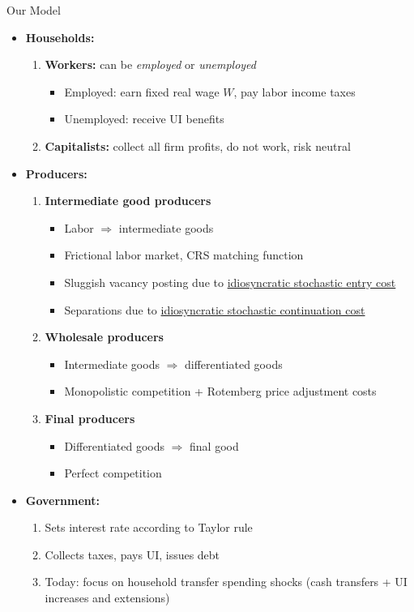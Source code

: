 \documentclass[9pt]{beamer}
\begin{document}
\begin{frame}{Our Model}
\begin{itemize}
		\setlength\itemsep{1em}
	\item \textbf{Households:}
	\begin{enumerate}
		\item \textbf{Workers:} can be \emph{employed }or \emph{unemployed}
		\begin{itemize}
			\item Employed: earn fixed real wage $W$, pay labor income taxes
			\item Unemployed: receive UI benefits
		\end{itemize}
		\item \textbf{Capitalists:} collect all firm profits, do not work, risk
		neutral
	\end{enumerate}
	\item \textbf{Producers:}
	\begin{enumerate}
		\item \textbf{Intermediate good producers}
		\begin{itemize}
			\item Labor $\Rightarrow$ intermediate goods
			\item Frictional labor market, CRS matching function
			\item Sluggish vacancy posting due to \uline{idiosyncratic stochastic entry
				cost}
			\item Separations due to \uline{idiosyncratic stochastic continuation cost}
		\end{itemize}
		\item \textbf{Wholesale producers}
		\begin{itemize}
			\item Intermediate goods $\Rightarrow$ differentiated goods
			\item Monopolistic competition + Rotemberg price adjustment costs
		\end{itemize}
		\item \textbf{Final producers}
		\begin{itemize}
			\item Differentiated goods $\Rightarrow$ final good
			\item Perfect competition
		\end{itemize}
	\end{enumerate}
	\item \textbf{Government:} 
	\begin{enumerate}
		\item Sets interest rate according to Taylor rule
		
		\item Collects taxes, pays UI, issues debt
		
		\item Today: focus on household transfer spending shocks (cash transfers + UI increases and extensions)
	\end{enumerate}
\end{itemize}
\end{frame}
\end{document}
